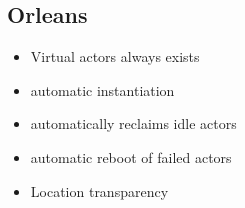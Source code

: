 \subsection{Orleans}
\begin{itemize}
	\item Virtual actors always exists
	\item automatic instantiation
	\item automatically reclaims idle actors
	\item automatic reboot of failed actors
	\item Location transparency
	
\end{itemize}